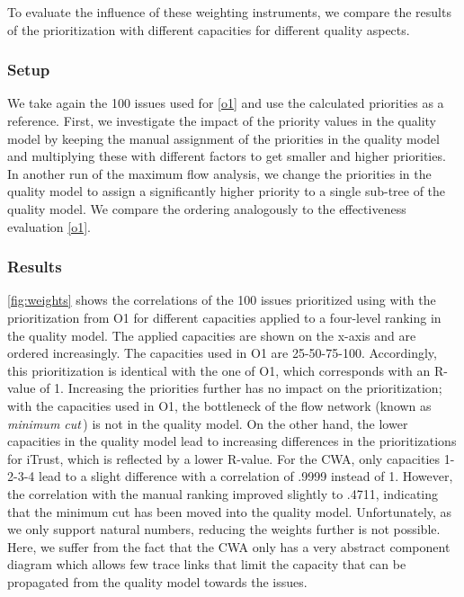 To evaluate the influence of these weighting instruments, we compare the results of the prioritization with different capacities for different quality aspects. %

\subsubsection{Setup}
We take again the 100 issues used for \ref{o1} and use the calculated priorities as a reference.
First, we investigate the impact of the priority values in the quality model by keeping the manual assignment of the priorities in the quality model %
and multiplying these with different factors to get smaller and higher priorities.
In another run of the maximum flow analysis, we change the priorities in the quality model to assign a significantly higher priority to a single sub-tree of the quality model.
We compare the ordering analogously to the effectiveness evaluation \ref{o1}.

\subsubsection{Results}

\autoref{fig:weights} shows the correlations of the 100 issues prioritized using \appr{} with the prioritization from O1 for different capacities applied to a four-level ranking in the quality model.
The applied capacities are shown on the x-axis and are ordered increasingly.
The capacities used in O1 are 25-50-75-100.
Accordingly, this prioritization is identical with the one of O1, which corresponds with an R-value of 1.
Increasing the priorities further has no impact on the prioritization; with the capacities used in O1, the bottleneck of the flow network (known as \emph{minimum cut}\,\cite{1056816,ford_fulkerson_1956}) %
is not in the quality model.
On the other hand, the lower capacities in the quality model lead to increasing differences in the prioritizations for iTrust, which is reflected by a lower R-value.
For the CWA, only capacities 1-2-3-4 lead to a slight difference with a correlation of .9999 instead of 1.
However, the correlation with the manual ranking improved slightly to .4711, indicating that the minimum cut has been moved into the quality model.
Unfortunately, as we only support natural numbers, reducing the weights further is not possible. Here, we suffer from the fact that the CWA only has a very abstract component diagram which allows few trace links that limit the capacity that can be propagated from the quality model towards the issues.

